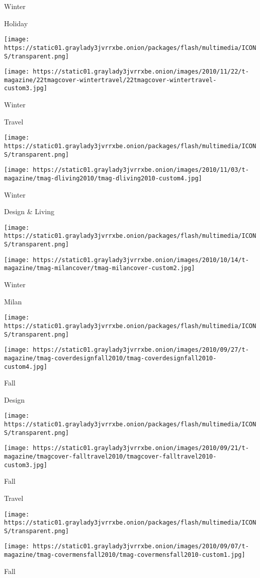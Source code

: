 Winter

Holiday

\texttt{[image: https://static01.graylady3jvrrxbe.onion/packages/flash/multimedia/ICONS/transparent.png]}

\texttt{[image: https://static01.graylady3jvrrxbe.onion/images/2010/11/22/t-magazine/22tmagcover-wintertravel/22tmagcover-wintertravel-custom3.jpg]}

Winter

Travel

\texttt{[image: https://static01.graylady3jvrrxbe.onion/packages/flash/multimedia/ICONS/transparent.png]}

\texttt{[image: https://static01.graylady3jvrrxbe.onion/images/2010/11/03/t-magazine/tmag-dliving2010/tmag-dliving2010-custom4.jpg]}

Winter

Design \& Living

\texttt{[image: https://static01.graylady3jvrrxbe.onion/packages/flash/multimedia/ICONS/transparent.png]}

\texttt{[image: https://static01.graylady3jvrrxbe.onion/images/2010/10/14/t-magazine/tmag-milancover/tmag-milancover-custom2.jpg]}

Winter

Milan

\texttt{[image: https://static01.graylady3jvrrxbe.onion/packages/flash/multimedia/ICONS/transparent.png]}

\texttt{[image: https://static01.graylady3jvrrxbe.onion/images/2010/09/27/t-magazine/tmag-coverdesignfall2010/tmag-coverdesignfall2010-custom4.jpg]}

Fall

Design

\texttt{[image: https://static01.graylady3jvrrxbe.onion/packages/flash/multimedia/ICONS/transparent.png]}

\texttt{[image: https://static01.graylady3jvrrxbe.onion/images/2010/09/21/t-magazine/tmagcover-falltravel2010/tmagcover-falltravel2010-custom3.jpg]}

Fall

Travel

\texttt{[image: https://static01.graylady3jvrrxbe.onion/packages/flash/multimedia/ICONS/transparent.png]}

\texttt{[image: https://static01.graylady3jvrrxbe.onion/images/2010/09/07/t-magazine/tmag-covermensfall2010/tmag-covermensfall2010-custom1.jpg]}

Fall

